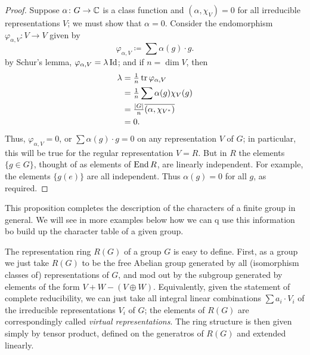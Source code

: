 \begin{proof}
Suppose $\alpha\colon G\to\mathbb{C}$ is a class function and $(\alpha,\chi_V)=0$
for all irreducible representations $V$; we must show that
$\alpha=0$. Consider the endomorphism $\varphi_{\alpha,V}\colon V\to V$
given by
\[
\varphi_{\alpha,V}\coloneq \sum\alpha(g)\cdot g.
\]
by Schur's lemma, $\varphi_{\alpha,V}=\lambda\operatorname{Id}$; and if $n=\dim V$, then
\begin{align*}
  \lambda
  &=\tfrac{1}{n}\operatorname{tr} \varphi_{\alpha,V}\\
  &=\tfrac{1}{n}\sum\alpha(g)\chi_V(g)\\
  &=\tfrac{|G|}{n}\overline{(\alpha,\chi_{V^*})}\\
  &=0.
\end{align*}
Thus, $\varphi_{\alpha,V}=0$, or $\sum\alpha(g)\cdot g=0$ on any
representation $V$ of $G$; in particular, this will be true for the regular
representation $V=R$. But in $R$ the elements $\{g\in G\}$, thought of as
elements of $\operatorname{End} R$, are linearly independent. For example, the elements
$\{g(e)\}$ are all independent. Thus $\alpha(g)=0$ for all $g$, as
required.
\end{proof}

This proposition completes the description of the characters of a finite
group in general. We will see in more examples below how we can q use this
information bo build up the character table of a given group.

The representation ring $R(G)$ of a group $G$ is easy to define. First, as
a group we just take $R(G)$ to be the free Abelian group generated by all
(isomorphism classes of) representations of $G$, and mod out by the
subgroup generated by elements of the form $V+W-(V\oplus W)$. Equivalently,
given the statement of complete reducibility, we can just take all integral
linear combinations $\sum a_i\cdot V_i$ of the irreducible representations
$V_i$ of $G$; the elements of $R(G)$ are correspondingly called
\emph{virtual representations}. The ring structure is then given simply by
tensor product, defined on the generatros of $R(G)$ and extended linearly.

